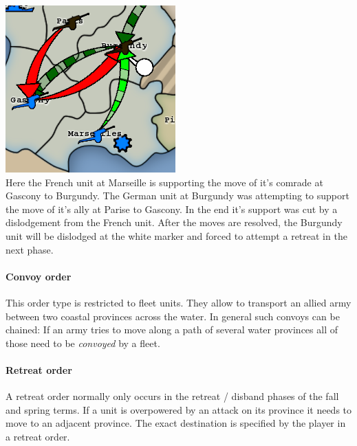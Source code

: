 \documentclass[pdftex,12pt,a4paper]{report}
\begin{document}
\includegraphics{./screenshots/DefRetreat0.png} \\[1cm]
Here the French unit at Marseille is supporting the move of it's
comrade at Gascony to Burgundy. The German unit at Burgundy was
attempting to support the move of it's ally at Parise to Gascony. In
the end it's support was cut by a dislodgement from the French
unit. After the moves are resolved, the Burgundy unit will be
dislodged at the white marker and forced to attempt a retreat in the
next phase.

\paragraph{Convoy order}
This order type is restricted to fleet units. They allow to transport
an allied army between two coastal provinces across the water. In general
such convoys can be chained: If an army tries to move along a path of
several water provinces all of those need to be \textit{convoyed} 
by a fleet.

\paragraph{Retreat order}
A retreat order normally only occurs in the retreat / disband phases of the
fall and spring terms. If a unit is overpowered by an attack on its
province it needs to move to an adjacent province. The exact destination
is specified by the player in a retreat order.
\end{document}
